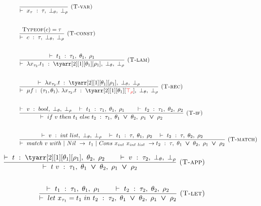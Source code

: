 \documentclass[a4paper,11pt,oneside]{article}
\theoremstyle{plain}
\newcommand{\bvee}{\boldsymbol{~\vee~}}
\newcommand{\typing}[4]{\vdash~#1~:~#2,~#3,~#4}
\newcommand{\bth}{\bot_\theta}
\newcommand{\brh}{\bot_\rho}
\newcommand{\trh}{\top_\rho}
\begin{document}
\begin{figure}[H]
\begin{adjustwidth}{-0em}{-1em}
\begin{small}
\begin{minipage}[t]{0.49\linewidth}
\begin{displaymath}
\begin{array}{l}

\dfrac
	{}
	{\typing{x_{\tau}}{\tau}{\bot_{\theta}}{\bot_{\rho}}}
	{\textsc{  (T-var)}} \\[1cm]

\dfrac
	{\textsc{Typeof}(c) = \tau}
	{\typing{c}{\tau}{\bot_{\theta}}{\bot_{\rho}}}
	{\textsc{  (T-const)}} \\[1cm]

	
\dfrac
	{\typing{t_1}{\tau_1}{\theta_1}{\rho_1}}
	{\typing{\lambda x_{\tau_2} . t_1}
		{\tyarr[2][1][\theta_1][\rho_1]}{\bth}{\brh}}
	{\textsc{  (T-lam)}} \\[1cm]		
	
\dfrac
	{\typing{\lambda x_{\tau_2}. t}{\tyarr[2][1][\theta_1][\rho_1]}{\bth}{\brh}}
	{\typing{\mu f:~(\tau_1, \theta_1) .~
		\lambda x_{\tau_2}. t}
		{\tyarr[2][1][\theta_1][\textcolor{red}{\trh}]}
			{\bth}{\brh}}
	{\textsc{  (T-rec)}}\\[1cm]		
	
	\dfrac
	{
		\typing{v}{bool}{\bth}{\brh} \quad
		\typing{t_1}{\tau_1}{\theta_1}{\rho_1} \qquad
		\typing{t_2}{\tau_1}{\theta_2}{\rho_2}
	}
	{	\typing{if~v~then~t_1~else~t_2}
		{\tau_1}{\theta_1 \bvee \theta_2}{\rho_1 \bvee \rho_2}}
	{\textsc{  (T-if)}}	\\[1cm]	
		
\dfrac
	{\typing{v}{int~list}{\bth}{\brh} \quad
	 \typing{t_1}{\tau}{\theta_1}{\rho_2}  \quad
	 \typing{t_2}{\tau}{\theta_2}{\rho_2}  }
	{\typing{match~v~with ~|~Nil~->~t_1~|~Cons~x_{int}~x_{int~list}~->t_2}{\tau}{\theta_1 \bvee \theta_2}
		{\rho_1 \bvee \rho_2}} 
{\textsc{  (T-match)}}
	
\end{array}
\end{displaymath}
\end{minipage} 
 \hfill 
\begin{minipage}[t]{0.49\linewidth}
\begin{displaymath}
\begin{array}{rrr}

\hspace*{-1.5cm}
\dfrac
	{
		\typing{t}{\tyarr[2][1][\theta_1][\rho_1]}{\theta_2}{\rho_2} \qquad
		\typing{v}{\tau_2}{\bth}{\brh}}
	{
		\typing{t~v}{\tau_1}{\theta_1 \bvee \theta_2}{\rho_1 \bvee \rho_2}}
	{
		\textsc{  (T-app)}} \\[1cm]	
\hspace*{-1cm}				
\dfrac
	{
		\typing{t_1}{\tau_1}{\theta_1}{\rho_1} \qquad
		\typing{t_2}{\tau_2}{\theta_2}{\rho_2}
	}
	{\typing
		{let~x_{\tau_1} = t_1~in~t_2}
		{\tau_2}
		{\theta_1 \bvee \theta_2}
		{\rho_1 \bvee \rho_2}}
	{\textsc{  (T-let)}} \\[1cm]	
					



\end{array}
\end{displaymath}
\end{minipage}
\end{small}
\end{adjustwidth}
\end{figure}
\end{document}
